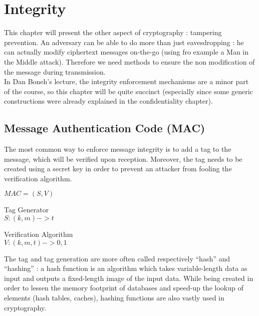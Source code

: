 \chapter{Integrity}


This chapter will present the other aspect of cryptography : tampering prevention. An adversary can be able to do more than just eavesdropping : he can actually modify ciphertext messages on-the-go (using fro example a Man in the Middle attack). Therefore we need methods to ensure the non modification of the message during transmission.\\
In Dan Boneh's lecture, the integrity enforcement mechanisms are a minor part of the course, so this chapter will be quite succinct (especially since some generic constructions were already explained in the confidentiality chapter).


\section{Message Authentication Code (MAC)}

The most common way to enforce message integrity is to add a tag to the message, which will be verified upon reception. Moreover, the tag needs to be created using a secret key in order to prevent an attacker from fooling the verification algorithm.

\begin{mydef} $MAC = (S,V)$  
\begin{flushright}
	\begin{minipage}[t]{0.45\textwidth}
		\indent   	Tag Generator \\
		\indent      $S: (k,m) -> t$   \\
	\end{minipage}
	\begin{minipage}[t]{0.45\textwidth}
		\indent	Verification Algorithm \\
		\indent    $V: (k,m,t) -> {0,1}$ \\
	\end{minipage}
\end{flushright}
\end{mydef}

The tag and tag generation are more often called respectively ``hash'' and ``hashing''  : a hash function is an algorithm which takes variable-length data as input and outputs a fixed-length image of the input data. While being created in order to lessen the memory footprint of databases and speed-up the lookup of elements (hash tables, caches), hashing functions are also vastly used in cryptography. 
 
